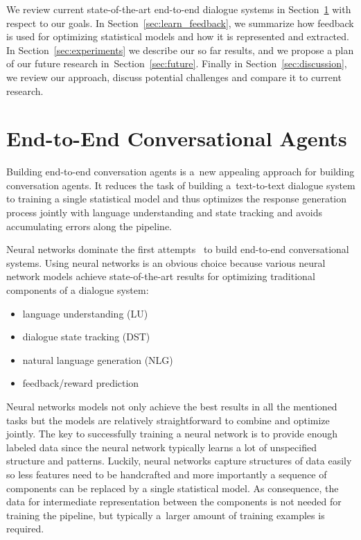 \documentclass[11pt]{article}
\begin{document}
We review current state-of-the-art end-to-end dialogue systems in Section~\ref{sec:e2end} with respect to our goals.
In Section~\ref{sec:learn_feedback}, we summarize how feedback is used for optimizing statistical models and how it is represented and extracted. 
In Section~\ref{sec:experiments} we describe our so far results, and we propose a plan of our future research in~Section~\ref{sec:future}. 
Finally in Section~\ref{sec:discussion}, we review our approach, discuss potential challenges and compare it to current research.


\section{End-to-End Conversational Agents}
\label{sec:e2end}
Building end-to-end conversation agents is a~new appealing approach for building conversation agents.
It reduces the task of building a~text-to-text dialogue system to training a single statistical model and thus optimizes the response generation process jointly with language understanding and state tracking and avoids accumulating errors along the pipeline.

Neural networks dominate the first attempts~\cite{williams2016end,bordes_learning_2016,weston2015endtoend_prereq} to build end-to-end conversational systems.
Using neural networks is an obvious choice because various neural network models achieve state-of-the-art results for optimizing traditional components of a dialogue system:
\begin{itemize}
    \item language understanding (LU) \cite{mairesse_spoken_2009} 
    \item dialogue state tracking (DST) \cite{williams_web-style_2014,henderson2014word,vodolan_hybrid_2015,platek_recurrent_2016}
    \item natural language generation (NLG) \cite{dusek_sequence2sequence_2016,wen_networkbased_2016}
    \item feedback/reward prediction \cite{su_learning_2015}
\end{itemize}
Neural networks models not only achieve the best results in all the mentioned tasks but the models are relatively straightforward to combine and optimize jointly.
The key to successfully training a neural network is to provide enough labeled data since the neural network typically learns a lot of unspecified structure and patterns.
Luckily, neural networks capture structures of data easily so less features need to be handcrafted and more importantly a sequence of components can be replaced by a single statistical model.
As consequence, the data for intermediate representation between the components is not needed for training the pipeline, but typically a~larger amount of training examples is required.
\end{document}
